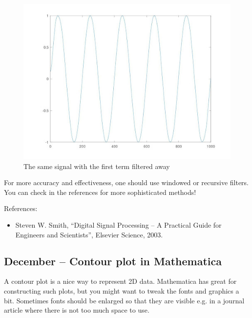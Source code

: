 \documentclass{article}
\begin{document}
\begin{figure}
  \includegraphics[width=\linewidth]{filtered.jpg}
  \caption{The same signal with the first term filtered away}
\end{figure}





For more accuracy and effectiveness, one should use windowed or recursive filters. You can check in the references for more sophisticated methods!


References:
\begin{itemize}
\item Steven W. Smith, ``Digital Signal Processing – A Practical Guide for Engineers and Scientists'', Elsevier Science, 2003.
\end{itemize}


\subsection{December – Contour plot in Mathematica}

A contour plot is a nice way to represent 2D data. Mathematica has great for constructing such plots, but you might want to tweak the fonts and graphics a bit. Sometimes fonts should be enlarged so that they are visible e.g. in a journal article where there is not too much space to use.
\end{document}
